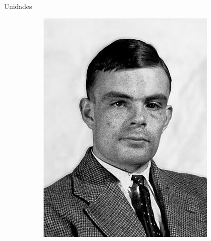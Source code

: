 \documentclass{beamer}
\begin{document}
\begin{frame}{Unidades}
\begin{figure}
\begin{subfigure}{0.24\textwidth}
        \includegraphics[width=\linewidth]{images/turing.jpg}
    \end{subfigure}
    \hfill
    \begin{subfigure}{0.24\textwidth}
        \centering

\end{subfigure}
\end{figure}
\end{frame}
\end{document}
